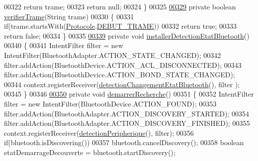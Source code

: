 \begin{DoxyCode}
00322             \textcolor{keywordflow}{return} trame;
00323         \textcolor{keywordflow}{return} null;
00324     \}
00325 
\hyperlink{classcom_1_1example_1_1ekawa_1_1_communication_a6421eb8129e103841f088870610b1b33}{00329}     \textcolor{keyword}{private} \textcolor{keywordtype}{boolean} \hyperlink{classcom_1_1example_1_1ekawa_1_1_communication_a6421eb8129e103841f088870610b1b33}{verifierTrame}(String trame)
00330     \{
00331         \textcolor{keywordflow}{if}(trame.startsWith(\hyperlink{classcom_1_1example_1_1ekawa_1_1_protocole}{Protocole}.\hyperlink{classcom_1_1example_1_1ekawa_1_1_protocole_a9a73b15a5d0408ae423cc6f4ff3e7c21}{DEBUT\_TRAME}))
00332             \textcolor{keywordflow}{return} \textcolor{keyword}{true};
00333         \textcolor{keywordflow}{return} \textcolor{keyword}{false};
00334     \}
00335 
\hyperlink{classcom_1_1example_1_1ekawa_1_1_communication_a6640c878b7a4c97af7ccda45e33ead80}{00339}     \textcolor{keyword}{private} \textcolor{keywordtype}{void} \hyperlink{classcom_1_1example_1_1ekawa_1_1_communication_a6640c878b7a4c97af7ccda45e33ead80}{installerDetectionEtatBluetooth}()
00340     \{
00341         IntentFilter filter = \textcolor{keyword}{new} IntentFilter(BluetoothAdapter.ACTION\_STATE\_CHANGED);
00342         filter.addAction(BluetoothDevice.ACTION\_ACL\_DISCONNECTED);
00343         filter.addAction(BluetoothDevice.ACTION\_BOND\_STATE\_CHANGED);
00344         context.registerReceiver(\hyperlink{classcom_1_1example_1_1ekawa_1_1_communication_a7fb7acee2a343c884103481715ab4e65}{detectionChangementEtatBluetooth}(), filter
      );
00345     \}
00346 
\hyperlink{classcom_1_1example_1_1ekawa_1_1_communication_a4b8036f1d4f4f37e15c85886af645900}{00350}     \textcolor{keyword}{private} \textcolor{keywordtype}{void} \hyperlink{classcom_1_1example_1_1ekawa_1_1_communication_a4b8036f1d4f4f37e15c85886af645900}{demarrerRecherche}()
00351     \{
00352         IntentFilter filter = \textcolor{keyword}{new} IntentFilter(BluetoothDevice.ACTION\_FOUND);
00353         filter.addAction(BluetoothAdapter.ACTION\_DISCOVERY\_STARTED);
00354         filter.addAction(BluetoothAdapter.ACTION\_DISCOVERY\_FINISHED);
00355         context.registerReceiver(\hyperlink{classcom_1_1example_1_1ekawa_1_1_communication_a4e46e30e8c22ae617b52260d198a76ca}{detectionPeripherique}(), filter);
00356         \textcolor{keywordflow}{if}(bluetooth.isDiscovering())
00357             bluetooth.cancelDiscovery();
00358         \textcolor{keywordtype}{boolean} etatDemarrageDecouverte = bluetooth.startDiscovery();

\end{DoxyCode}
